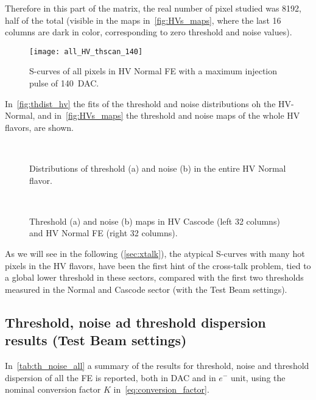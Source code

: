 Therefore in this part of the matrix, the real number of pixel studied was 8192, half of the total (visible in the maps in~\autoref{fig:HVs_maps}, where the last 16 columns are dark in color, corresponding to zero threshold and noise values).


\begin{figure}[h!]
\centering
\texttt{[image: all\_HV\_thscan\_140]}
\caption{S-curves of all pixels in HV Normal FE with a maximum injection pulse of \SI{140}{DAC}.}
\label{fig:hv_scurve_140}
\end{figure}

In~\autoref{fig:thdist_hv} the fits of the threshold and noise distributions oh the HV-Normal, and in~\autoref{fig:HVs_maps} the threshold and noise maps of the whole HV flavors, are shown. 

\begin{figure}[h!]
\centering
{}\quad
{}\\
\caption{Distributions of threshold (a) and noise (b) in the entire HV Normal flavor.}
\label{fig:thdist_hv}
\end{figure}

\begin{figure}[h!]
\centering
{}\quad
{}\\
\caption{Threshold (a) and noise (b) maps in HV Cascode (left 32 columns) and HV Normal FE (right 32 columns).}
\label{fig:HVs_maps}
\end{figure}

As we will see in the following (\autoref{sec:xtalk}), the atypical S-curves with many hot pixels in the HV flavors, have been the first hint of the cross-talk problem, tied to a global lower threshold in these sectors, compared with the first two thresholds measured in the Normal and Cascode sector (with the Test Beam settings). 

\newpage
\subsection{Threshold, noise ad threshold dispersion results (Test Beam settings)}\label{sec:th_summary}

In~\autoref{tab:th_noise_all} a summary of the results for threshold, noise and threshold dispersion of all the FE is reported, both in DAC and in $e^{-}$ unit, using the nominal conversion factor $K$ in~\autoref{eq:conversion_factor}.

